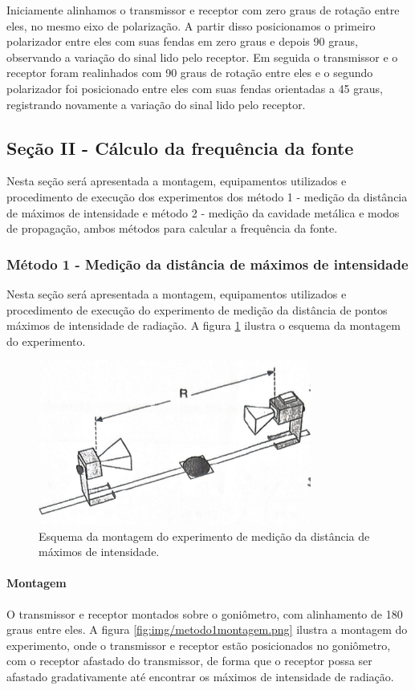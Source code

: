 \documentclass[12pt]{article}
\begin{document}
Iniciamente alinhamos o transmissor e receptor com zero graus de
rotação entre eles, no mesmo eixo de polarização. A partir disso posicionamos
o primeiro polarizador entre eles com suas fendas em zero graus e depois 90
graus, observando a variação do sinal lido pelo receptor. Em seguida o
transmissor e o receptor foram realinhados com 90 graus de rotação entre eles
e o segundo polarizador foi posicionado entre eles com suas fendas orientadas
a 45 graus, registrando novamente a variação do sinal lido pelo receptor.
\subsection{Seção II - Cálculo da frequência da fonte}
Nesta seção será apresentada a montagem, equipamentos utilizados e
procedimento de execução dos experimentos dos método 1 - medição da
distância de máximos de intensidade e método 2 - medição da cavidade
metálica e modos de propagação, ambos métodos para calcular a
frequência da fonte.

\subsubsection{Método 1 - Medição da distância de máximos de intensidade}
Nesta seção será apresentada a montagem, equipamentos utilizados e
procedimento de execução do experimento de medição da distância de
pontos máximos de intensidade de radiação. A figura
\ref{fig:img/metodo1esquema.png}
ilustra o esquema da montagem do experimento.

\begin{figure}[H]
  \centering
  \includegraphics[width=0.8\textwidth]{img/metodo1esquema.png}
  \caption{Esquema da montagem do experimento de medição da distância
  de máximos de intensidade.}
  \label{fig:img/metodo1esquema.png}
\end{figure}

\paragraph{Montagem}
O transmissor e receptor montados sobre o goniômetro,  com
alinhamento de 180 graus entre eles. A figura \ref{fig:img/metodo1montagem.png}
ilustra a montagem do experimento, onde o transmissor e receptor
estão posicionados no goniômetro, com o receptor afastado do
transmissor, de forma que o receptor possa ser afastado
gradativamente até encontrar os máximos de intensidade de radiação.
\end{document}
